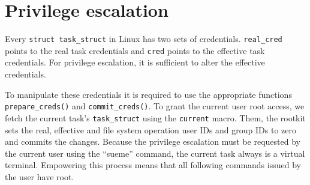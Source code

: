 \section{Privilege escalation}
Every \texttt{struct task\_struct} in Linux has two sets of credentials. 
\texttt{real\_cred} points to the real task credentials and \texttt{cred} points 
to the effective task credentials. For privilege escalation, it is sufficient to 
alter the effective credentials.\par
To manipulate these credentials it is required to use the appropriate functions 
\texttt{prepare\_creds()} and \texttt{commit\_creds()}.
To grant the current user root access, we fetch the current task's 
\texttt{task\_struct} using the \texttt{current} macro. Them, the rootkit sets 
the real, effective and file system operation user IDs and group IDs to zero 
and commits the changes. Because the privilege escalation must be requested by 
the current user using the ``sueme'' command, the current task always is a 
virtual terminal. Empowering this process means that all following commands 
issued by the user have root.